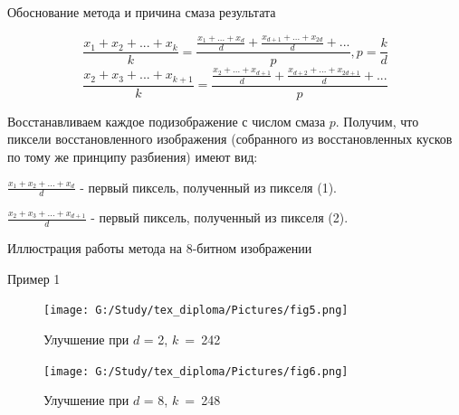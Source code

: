 \documentclass[10pt]{beamer}
\begin{document}
\begin{frame}{Обоснование метода и причина смаза результата}

\begin{block}{}


\begin{equation}\label{1}
\frac{x_1 + x_2 + ... + x_k}{k} = \frac{\frac{x_1 + ... + x_d}{d} + \frac{x_{d+1} + ... + x_{2d}}{d} + ...}{p}, p = \frac{k}{d}
\end{equation}
\begin{equation}\label{2}
\frac{x_2 + x_3 + ... + x_{k+1}}{k} = \frac{\frac{x_2 + ... + x_{d+1}}{d} + \frac{x_{d+2} + ... + x_{2d+1}}{d} + ...}{p}
\end{equation}

Восстанавливаем каждое подизображение с числом смаза $p$. Получим, что пиксели восстановленного изображения (собранного из восстановленных кусков по тому же принципу разбиения) имеют вид:


{\Large$\frac{x_1 + x_2 + ... + x_d}{d}$} - первый пиксель, полученный из пикселя (1).


{\Large$\frac{x_2 + x_3 + ... + x_{d+1}}{d}$} - первый пиксель, полученный из пикселя (2).


\end{block}

\end{frame}

\begin{frame}{Иллюстрация работы метода на 8-битном изображении}
\begin{block}{Пример 1}
\hspace*{-\parindent}
\begin{minipage}{50mm}
    \begin{figure}[H]
            \texttt{[image: G:/Study/tex\_diploma/Pictures/fig5.png]}
            \label{Fig3}
            \caption[Улучшение при $d$ = 2, $k$~=~242]{Улучшение при $d$ = 2, $k$~=~242}
        \end{figure}
\end{minipage}
\begin{minipage}{50mm}
  \begin{figure}[H]
            \texttt{[image: G:/Study/tex\_diploma/Pictures/fig6.png]}
            \label{Fig4}
            \caption[Улучшение при $d$ = 8, $k$~=~248]{Улучшение при $d$ = 8, $k$~=~248}
        \end{figure}
\end{minipage}
\hfill
\end{block}
\end{frame}
\end{document}
